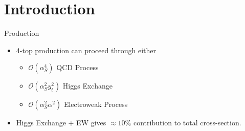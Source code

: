 \documentclass[english,aspectratio=169]{beamer}
\begin{document}
\section{Introduction}
\begin{frame}{Production}
  \begin{minipage}[c][\textheight]{0.45\textwidth}
    \begin{itemize}
      \item 4-top production can proceed through either
        \begin{itemize}
          \item<2,5-> $\mathcal{O}(\alpha_S^4)$ QCD Process
          \item<3,5-> $\mathcal{O}(\alpha_S^2 y_t^2)$ Higgs Exchange
          \item<4,5-> $\mathcal{O}(\alpha_S^2\alpha^2)$ Electroweak Process
        \end{itemize}
      \item<5-> Higgs Exchange + EW gives $\approx10\%$ contribution to total cross-section.
    \end{itemize}
  \end{minipage}
  \begin{minipage}[c][\textheight]{0.45\textwidth}
    \centering
\end{minipage}
\end{frame}
\end{document}
